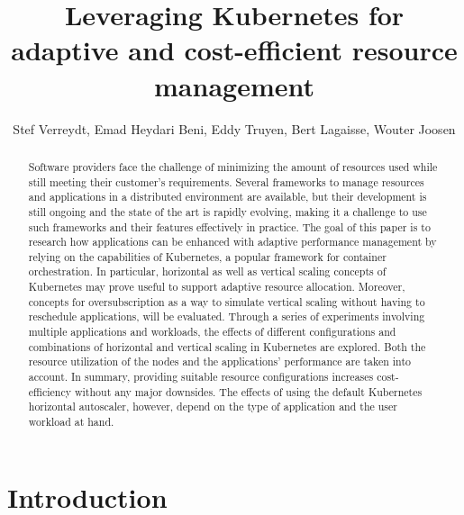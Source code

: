 \documentclass[sigplan,9pt]{acmart}
\begin{document}
\title{Leveraging Kubernetes for adaptive and cost-efficient resource management}

\author{Stef Verreydt, Emad Heydari Beni, Eddy Truyen, Bert Lagaisse, Wouter Joosen}
\renewcommand{\shortauthors}{S. Verreydt et al.}

\begin{abstract}
Software providers face the challenge of minimizing the amount of resources used while still meeting their customer's requirements. Several frameworks to manage resources and applications in a distributed environment are available, but their development is still ongoing and the state of the art is rapidly evolving, making it a challenge to use such frameworks and their features effectively in practice. The goal of this paper is to research how applications can be enhanced with adaptive performance management by relying on the capabilities of Kubernetes, a popular framework for container orchestration. In particular, horizontal as well as vertical scaling concepts of Kubernetes may prove useful to support adaptive resource allocation. Moreover, concepts for oversubscription as a way to simulate vertical scaling without having to reschedule applications, will be evaluated. Through a series of experiments involving multiple applications and workloads, the effects of different configurations and combinations of horizontal and vertical scaling in Kubernetes are explored. Both the resource utilization of the nodes and the applications' performance are taken into account. In summary, providing suitable resource configurations increases cost-efficiency without any major downsides. The effects of using the default Kubernetes horizontal autoscaler, however, depend on the type of application and the user workload at hand.
\end{abstract}

\maketitle


\section{Introduction}
\label{chap:introduction}


%
\end{document}
